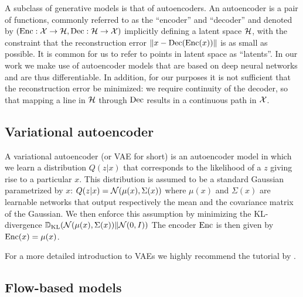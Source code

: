 \documentclass[../main.tex]{subfiles}
\begin{document}
A subclass of generative models is that of autoencoders.
An autoencoder is a pair of functions, commonly referred to as the ``encoder'' and ``decoder'' and denoted by $(\operatorname{Enc}: \mathcal{X} \to \mathcal{H}, \operatorname{Dec}: \mathcal{H} \to \mathcal{X})$ implicitly defining a latent space $\mathcal{H}$, with the constraint that the reconstruction error $\left\lVert x - \operatorname{Dec}(\operatorname{Enc}(x))\right\rVert$ is as small as possible.
It is common for us to refer to points in latent space as ``latents''.
In our work we make use of autoencoder models that are based on deep neural networks and are thus differentiable.
In addition, for our purposes it is not sufficient that the reconstruction error be minimized: we require continuity of the decoder, so that mapping a line in $\mathcal{H}$ through $\operatorname{Dec}$ results in a continuous path in $\mathcal{X}$.

\subsection{Variational autoencoder}

A variational autoencoder (or VAE for short) \cite{kingmaAutoEncoding2014} is an autoencoder model in which we learn a distribution $Q(z | x)$ that corresponds to the likelihood of a $z$ giving rise to a particular $x$.
This distribution is assumed to be a standard Gaussian parametrized by $x$: $Q(z | x) = \mathcal{N}(\mu(x), \Sigma(x))$ where $\mu(x)$ and $\Sigma(x)$ are learnable networks that output respectively the mean and the covariance matrix of the Gaussian. We then enforce this assumption by minimizing the KL-divergence $\mathbb{D}_\text{KL}(\mathcal{N}(\mu(x), \Sigma(x)) \| \mathcal{N}(0, I))$
The encoder $\operatorname{Enc}$ is then given by $\operatorname{Enc}(x) = \mu(x)$.

For a more detailed introduction to VAEs we highly recommend the tutorial by \citeauthor{doerschTutorial2021} \cite{doerschTutorial2021}.

\subsection{Flow-based models}
\label{bg/nf}
\end{document}

